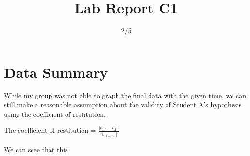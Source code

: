 \documentclass{article}
\title{Lab Report C1}
\date{2/5}
\begin{document}
\maketitle
\section*{Data Summary}
While my group was not able to graph the final data with the given time, we can still make a reasonable assumption about the validity of Student A's hypothesis using the coefficient of restitution.

\begin{center}The coefficient of restitution = $\frac{\lvert v_{1f} - v_{2f}\rvert}{ \lvert v_{1i - v_{2i}}\rvert }$

\end{center}
We can seee that this 
\end{document}
